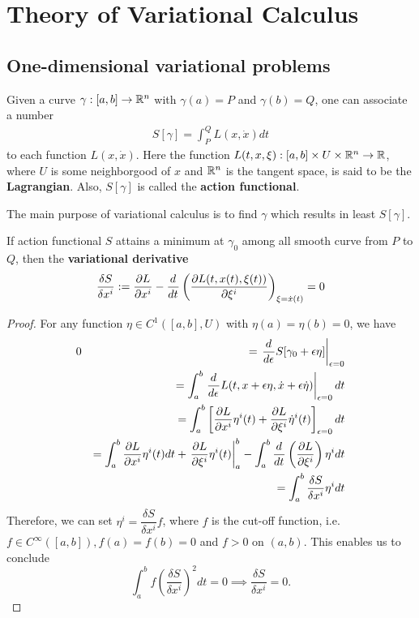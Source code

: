 \newpage
\section{Theory of Variational Calculus}
\subsection{One-dimensional variational problems}
\begin{definition}
	Given a curve $\gamma:[a, b] \rightarrow \mathbb{R}^n$ with $\gamma(a) = P$ and $\gamma(b) = Q$, one can associate a number
	\begin{eqnarray}
		S[\gamma] = \int_{P}^{Q} L(x, \dot{x}) dt
	\end{eqnarray}
	to each function $L(x, \dot{x})$. Here the function $L(t, x, \xi): [a, b] \times U \times \mathbb{R}^n \rightarrow \mathbb{R}$, where $U$ is some neighborgood of $x$ and $\mathbb{R}^n$ is the tangent space, is said to be the \textbf{Lagrangian}. Also, $S[\gamma]$ is called the \textbf{action functional}.
\end{definition}

The main purpose of variational calculus is to find $\gamma$ which results in least $S[\gamma]$.

\begin{theorem}
	If action functional $S$ attains a minimum at $\gamma_0$ among all smooth curve from $P$ to $Q$, then the \textbf{variational derivative}
	\begin{eqnarray}
	\frac{\delta S}{\delta x^i} := \frac{ \partial L}{ \partial x^i } - \frac{d^{}  }{d t^{}}\left( \frac{ \partial L(t, x(t), \xi(t))}{ \partial \xi^i }  \right)_{\xi = \dot{x}(t)} = 0
	\end{eqnarray}
\end{theorem}

\begin{proof}
	For any function $\eta \in C^1([a, b], U)$ with $\eta(a) = \eta(b) = 0$, we have
	\begin{eqnarray}
	0 &&= \left.\frac{d^{}  }{d \epsilon^{}} S[\gamma_0 + \epsilon \eta] \right|_{\epsilon = 0}
	\nonumber\\
	&&= \int_{a}^{b} \left. \frac{d^{} }{d \epsilon^{}} L(t, x + \epsilon \eta, \dot{x} + \epsilon \dot{\eta}) \right|_{\epsilon = 0} dt
	\nonumber\\
	&&= \int_{a}^{b} \left[ \frac{ \partial L}{ \partial x^i }\eta^i(t) + \frac{ \partial L}{ \partial \xi^i } \dot{\eta}^i(t) \right]_{\epsilon = 0} dt
	\nonumber\\
	&&= \int_{a}^{b} \frac{ \partial L}{ \partial x^i }\eta^i(t)dt + \left. \frac{ \partial L}{ \partial \xi^i } \eta^i(t) \right|_a^b - \int_{a}^{b} \frac{d^{}  }{d t^{}} \left( \frac{ \partial L}{ \partial \xi^i } \right) \eta^i dt
	\nonumber\\
	&&= \int_{a}^{b} \frac{\delta S}{\delta x^i} \eta^i dt
	\end{eqnarray}
	Therefore, we can set $\eta^i = \dfrac{\delta S}{\delta x^i} f$, where $f$ is the cut-off function, i.e. $f \in C^{\infty}([a, b]), f(a) = f(b) = 0$ and $f>0$ on $(a, b)$. This enables us to conclude
	\[ \int_{a}^{b} f \left( \frac{\delta S}{\delta x^i} \right)^2 dt = 0 \implies \frac{\delta S}{\delta x^i} = 0. \]
\end{proof}

